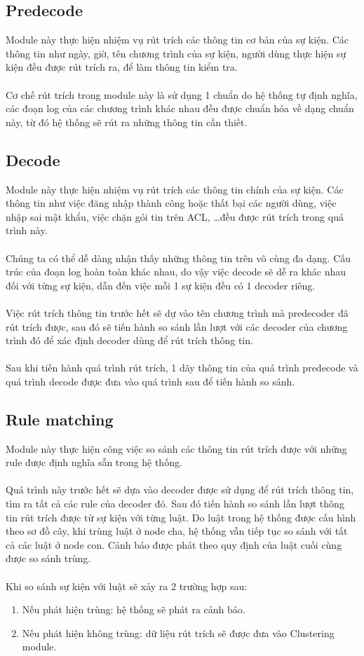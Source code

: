   \subsection{Predecode}
   Module này thực hiện nhiệm vụ rút trích các thông tin cơ bản của sự kiện. Các
   thông tin như ngày, giờ, tên chương trình của sự kiện, người dùng thực hiện
   sự kiện đều được rút trích ra, để làm thông tin kiểm tra.\\\\
   Cơ chế rút trích trong module này là sử dụng 1 chuẩn do hệ thống tự định
   nghĩa, các đoạn log của các chương trình khác nhau đều được chuẩn hóa về dạng
   chuẩn này, từ đó hệ thống sẽ rút ra những thông tin cần thiết.
  \subsection{Decode}
   Module này thực hiện nhiệm vụ rút trích các thông tin chính của sự kiện.
   Các thông tin như việc đăng nhập thành công hoặc thất bại các người dùng,
   việc nhập sai mật khẩu, việc chặn gói tin trên ACL, \ldots đều được rút trích
   trong quá trình này.\\\\
   Chúng ta có thể dễ dàng nhận thấy những thông tin trên vô cùng đa dạng. Cấu
   trúc của đoạn log hoàn toàn khác nhau, do vậy việc decode sẽ dễ ra khác nhau
   đối với từng sự kiện, dẫn đến việc mỗi 1 sự kiện đều có 1 decoder riêng.\\\\
   Việc rút trích thông tin trước hết sẽ dự vào tên chương trình mà predecoder
   đã rút trích được, sau đó sẽ tiến hành so sánh lần lượt với các decoder của
   chương trình đó để xác định decoder dùng để rút trích thông tin.\\\\
   Sau khi tiến hành quá trình rút trích, 1 dãy thông tin của
   quá trình predecode và quá trình decode được đưa vào quá trình sau để tiến hành so sánh.
  \subsection{Rule matching}
   Module này thực hiện công việc so sánh các thông tin rút trích được với những
   rule được định nghĩa sẵn trong hệ thống.\\\\
   Quá trình này trước hết sẽ dựa vào decoder được sử dụng để rút trích thông
   tin, tìm ra tất cả các rule của decoder đó. Sau đó tiến hành so sánh lần lượt
   thông tin rút trích được từ sự kiện với từng luật. Do luật trong hệ thống
   được cấu hình theo sơ đồ cây, khi trùng luật ở node cha, hệ thống vẫn tiếp
   tục so sánh với tất cả các luật ở node con. Cảnh báo được phát theo quy
   định của luật cuối cùng được so sánh trùng.\\\\
   Khi so sánh sự kiện với luật sẽ xảy ra 2 trường hợp sau: 
  \begin{enumerate}
    \item Nếu phát hiện trùng: hệ thống sẽ phát ra cảnh báo.
    \item Nếu phát hiện không trùng: dữ liệu rút trích sẽ được đưa vào
    Clustering module.
    \end{enumerate}
